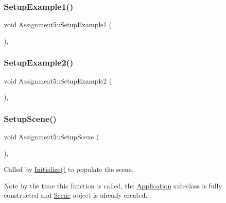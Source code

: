 \subsubsection{\texorpdfstring{Setup\+Example1()}{SetupExample1()}}
{\footnotesize\ttfamily void Assignment5\+::\+Setup\+Example1 (\begin{DoxyParamCaption}{ }\end{DoxyParamCaption})\hspace{0.3cm}{\ttfamily [private]}, {\ttfamily [virtual]}}

\hypertarget{class_assignment5_ad8bde7598ac25e86667a2b0cb45ef399}{}\label{class_assignment5_ad8bde7598ac25e86667a2b0cb45ef399}
\subsubsection{\texorpdfstring{Setup\+Example2()}{SetupExample2()}}
{\footnotesize\ttfamily void Assignment5\+::\+Setup\+Example2 (\begin{DoxyParamCaption}{ }\end{DoxyParamCaption})\hspace{0.3cm}{\ttfamily [private]}, {\ttfamily [virtual]}}

\hypertarget{class_assignment5_a43328e09e6241ae6c62a9b7be7659b3b}{}\label{class_assignment5_a43328e09e6241ae6c62a9b7be7659b3b}
\subsubsection{\texorpdfstring{Setup\+Scene()}{SetupScene()}}
{\footnotesize\ttfamily void Assignment5\+::\+Setup\+Scene (\begin{DoxyParamCaption}{ }\end{DoxyParamCaption})\hspace{0.3cm}{\ttfamily [private]}, {\ttfamily [virtual]}}



Called by \hyperlink{class_application_a17cf1ea4552d26a1c20f7d98d793d41d}{Initialize()} to populate the scene.

Note by the time this function is called, the \hyperlink{class_application}{Application} sub-\/class is fully constructed and \hyperlink{class_scene}{Scene} object is already created.

